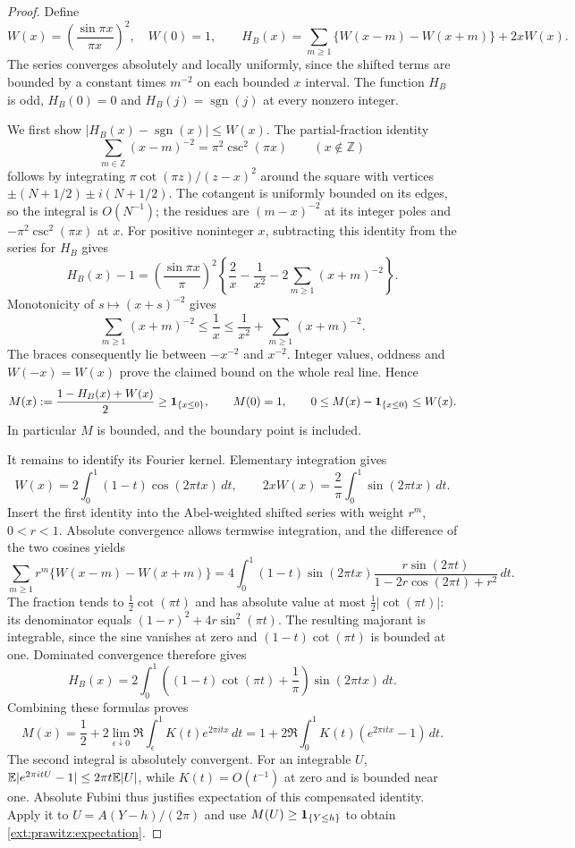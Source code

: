 \begin{proof}
Define
\[
 W(x)=\left(\frac{\sin\pi x}{\pi x}\right)^2,\quad W(0)=1,
 \qquad
 H_B(x)=\sum_{m\ge1}\{W(x-m)-W(x+m)\}+2xW(x).
\]
The series converges absolutely and locally uniformly, since the shifted
terms are bounded by a constant times $m^{-2}$ on each bounded $x$ interval.
The function $H_B$ is odd, $H_B(0)=0$ and
$H_B(j)=\operatorname{sgn}(j)$ at every nonzero integer.

We first show $|H_B(x)-\operatorname{sgn}(x)|\le W(x)$.
The partial-fraction identity
\[
 \sum_{m\in\mathbb Z}(x-m)^{-2}=\pi^2\csc^2(\pi x)
 \qquad(x\notin\mathbb Z)
\]
follows by integrating $\pi\cot(\pi z)/(z-x)^2$ around the square
with vertices $\pm(N+1/2)\pm i(N+1/2)$. The cotangent is uniformly
bounded on its edges, so the integral is $O(N^{-1})$; the residues are
$(m-x)^{-2}$ at its integer poles and $-\pi^2\csc^2(\pi x)$ at $x$.
For positive noninteger $x$, subtracting this identity from the series
for $H_B$ gives
\[
 H_B(x)-1=\left(\frac{\sin\pi x}{\pi}\right)^2
 \left\{\frac2x-\frac1{x^2}-2\sum_{m\ge1}(x+m)^{-2}\right\}.
\]
Monotonicity of $s\mapsto(x+s)^{-2}$ gives
\[
 \sum_{m\ge1}(x+m)^{-2}\le\frac1x
 \le\frac1{x^2}+\sum_{m\ge1}(x+m)^{-2}.
\]
The braces consequently lie between $-x^{-2}$ and $x^{-2}$.
Integer values, oddness and $W(-x)=W(x)$ prove the claimed bound
on the whole real line. Hence
\[
 M(x):=\frac{1-H_B(x)+W(x)}2\ge\mathbf 1_{\{x\le0\}},
 \qquad M(0)=1,
 \qquad 0\le M(x)-\mathbf 1_{\{x\le0\}}\le W(x).
\]
In particular $M$ is bounded, and the boundary point is included.

It remains to identify its Fourier kernel. Elementary integration gives
\[
 W(x)=2\int_0^1(1-t)\cos(2\pi tx)\,dt,
 \qquad 2xW(x)=\frac2\pi\int_0^1\sin(2\pi tx)\,dt.
\]
Insert the first identity into the Abel-weighted shifted series with
weight $r^m$, $0<r<1$. Absolute convergence allows termwise integration,
and the difference of the two cosines yields
\[
 \sum_{m\ge1}r^m\{W(x-m)-W(x+m)\}
 =4\int_0^1(1-t)\sin(2\pi tx)
 \frac{r\sin(2\pi t)}{1-2r\cos(2\pi t)+r^2}\,dt.
\]
The fraction tends to $\tfrac12\cot(\pi t)$ and has absolute value
at most $\tfrac12|\cot(\pi t)|$: its denominator equals
$(1-r)^2+4r\sin^2(\pi t)$. The resulting majorant is integrable,
since the sine vanishes at zero and $(1-t)\cot(\pi t)$ is bounded
at one. Dominated convergence therefore gives
\[
 H_B(x)=2\int_0^1
 \left((1-t)\cot(\pi t)+\frac1\pi\right)\sin(2\pi tx)\,dt.
\]
Combining these formulas proves
\[
 M(x)=\frac12+2\lim_{\epsilon\downarrow0}\Re\int_\epsilon^1
                 K(t)e^{2\pi itx}\,dt
     =1+2\Re\int_0^1K(t)(e^{2\pi itx}-1)\,dt.
\]
The second integral is absolutely convergent. For an integrable $U$,
$\mathbb E|e^{2\pi itU}-1|\le2\pi t\mathbb E|U|$, while $K(t)=O(t^{-1})$
at zero and is bounded near one. Absolute Fubini thus justifies
expectation of this compensated identity. Apply it to
$U=A(Y-h)/(2\pi)$ and use $M(U)\ge\mathbf 1_{\{Y\le h\}}$ to obtain
\eqref{ext:prawitz:expectation}.
\end{proof}

